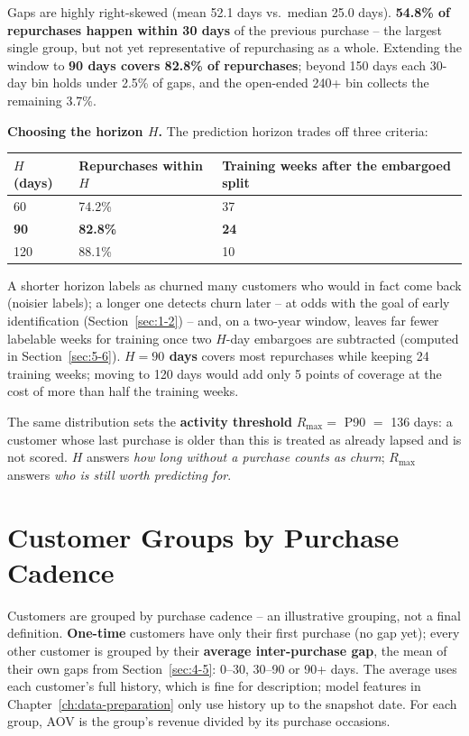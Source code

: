 Gaps are highly right-skewed (mean 52.1 days vs.\ median 25.0 days). \textbf{54.8\% of repurchases happen within 30 days} of the previous purchase -- the largest single group, but not yet representative of repurchasing as a whole. Extending the window to \textbf{90 days covers 82.8\% of repurchases}; beyond 150 days each 30-day bin holds under 2.5\% of gaps, and the open-ended 240+ bin collects the remaining 3.7\%.

\textbf{Choosing the horizon $H$.} The prediction horizon trades off three criteria:

\begin{center}
\begin{tabular}{@{}p{1.6cm}p{5cm}p{4.6cm}@{}}
    \toprule
    $H$ (days) & Repurchases within $H$ & Training weeks after the embargoed split \\
    \midrule
    60 & 74.2\% & 37 \\
    \textbf{90} & \textbf{82.8\%} & \textbf{24} \\
    120 & 88.1\% & 10 \\
    \bottomrule
\end{tabular}
\end{center}

A shorter horizon labels as churned many customers who would in fact come back (noisier labels); a longer one detects churn later -- at odds with the goal of early identification (Section~\ref{sec:1-2}) -- and, on a two-year window, leaves far fewer labelable weeks for training once two $H$-day embargoes are subtracted (computed in Section~\ref{sec:5-6}). \textbf{$H = 90$ days} covers most repurchases while keeping 24 training weeks; moving to 120 days would add only 5 points of coverage at the cost of more than half the training weeks.

The same distribution sets the \textbf{activity threshold} $R_{\max} = $ P90 $=$ 136 days: a customer whose last purchase is older than this is treated as already lapsed and is not scored. $H$ answers \emph{how long without a purchase counts as churn}; $R_{\max}$ answers \emph{who is still worth predicting for}.

\section{Customer Groups by Purchase Cadence}
\label{sec:4-6}

Customers are grouped by purchase cadence -- an illustrative grouping, not a final definition. \textbf{One-time} customers have only their first purchase (no gap yet); every other customer is grouped by their \textbf{average inter-purchase gap}, the mean of their own gaps from Section~\ref{sec:4-5}: 0--30, 30--90 or 90+ days. The average uses each customer's full history, which is fine for description; model features in Chapter~\ref{ch:data-preparation} only use history up to the snapshot date. For each group, AOV is the group's revenue divided by its purchase occasions.

